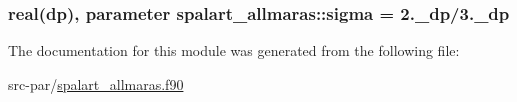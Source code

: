 \hypertarget{classspalart__allmaras_aaaa63e9dac449d479c165c41d1061ba3}{
\subsubsection[{sigma}]{\setlength{\rightskip}{0pt plus 5cm}real(dp), parameter spalart\-\_\-allmaras\-::sigma = 2.\-\_\-dp/3.\-\_\-dp}}\label{classspalart__allmaras_aaaa63e9dac449d479c165c41d1061ba3}


The documentation for this module was generated from the following file\-:\begin{DoxyCompactItemize}
\item 
src-\/par/\hyperlink{spalart__allmaras_8f90}{spalart\-\_\-allmaras.\-f90}\end{DoxyCompactItemize}
